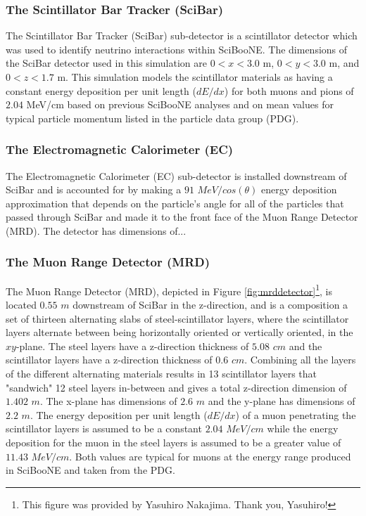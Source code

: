 \documentclass[11pt]{article}
\begin{document}
\subsubsection{The Scintillator Bar Tracker (SciBar)}
\label{subsub:SciBar}
The Scintillator Bar Tracker (SciBar) sub-detector is a scintillator detector which was used to identify neutrino interactions within SciBooNE. The dimensions of the SciBar detector used in this simulation are $0 < x < 3.0$ m, $0 < y < 3.0$ m, and $0 < z < 1.7$ m. This simulation models the scintillator materials as having a constant energy deposition per unit length ($dE/dx$) for both muons and pions of $2.04$ MeV/cm based on previous SciBooNE analyses and on mean values for typical particle momentum listed in the particle data group (PDG).

\subsubsection{The Electromagnetic Calorimeter (EC)}
\label{subsub:EC}
The Electromagnetic Calorimeter (EC) sub-detector is installed downstream of SciBar and is accounted for by making a $91$ $MeV/cos(\theta)$ energy deposition approximation that depends on the particle's angle for all of the particles that passed through SciBar and made it to the front face of the Muon Range Detector (MRD). The detector has dimensions of...

\subsubsection{The Muon Range Detector (MRD)}
\label{subsub:MRD}
The Muon Range Detector (MRD), depicted in Figure \ref*{fig:mrddetector}\footnote{This figure was provided by Yasuhiro Nakajima. Thank you, Yasuhiro!}, is located $0.55$ $m$ downstream of SciBar in the z-direction, and is a composition a set of thirteen alternating slabs of steel-scintillator layers, where the scintillator layers alternate between being horizontally oriented or vertically oriented, in the $xy$-plane. The steel layers have a z-direction thickness of $5.08$ $cm$ and the scintillator layers have a z-direction thickness of $0.6$ $cm$. Combining all the layers of the different alternating materials results in 13 scintillator layers that "sandwich" 12 steel layers in-between and gives a total z-direction dimension of $1.402$ $m$. The x-plane has dimensions of $2.6$ $m$ and the y-plane has dimensions of $2.2$ $m$. The energy deposition per unit length ($dE/dx$) of a muon penetrating the scintillator layers is assumed to be a constant $2.04$ $MeV/cm$ while the energy deposition for the muon in the steel layers is assumed to be a greater value of $11.43$ $MeV/cm$. Both values are typical for muons at the energy range produced in SciBooNE and taken from the PDG.
\end{document}
